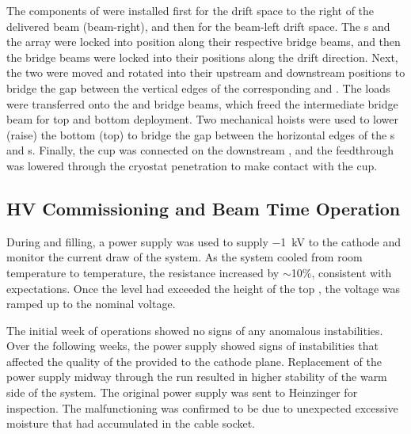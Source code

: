 The  components of  were installed first for the drift space to the right of the delivered beam (beam-right), and then for the beam-left drift space.
The s and the  array were locked into position along their respective bridge beams, and then the bridge beams were locked into their positions along the drift direction.
Next, the two  were moved and rotated into their upstream and downstream positions to bridge the gap between the vertical edges of the corresponding  and .
The  loads were transferred onto the  and   bridge beams, which freed the intermediate bridge beam for top and bottom  deployment.
Two mechanical hoists were used to lower (raise) the bottom (top)  to bridge the gap between the horizontal edges of the s and s.
Finally, the  cup was connected on the downstream , and the  feedthrough was lowered through the cryostat penetration to make contact with the cup.

\subsection{HV Commissioning and Beam Time Operation}
\label{sec:fdsp-hv-commissioning-operation}
During \cooldown and  filling, a power supply was used to supply $-$\SI{1}{kV} to the cathode and monitor the current draw of the system.
As the system cooled from room temperature to  temperature, the resistance increased by $\sim$10\%, consistent with expectations.
Once the  level had exceeded the height of the top , the voltage was ramped up to the nominal voltage.



The initial week of  operations showed no signs of any anomalous instabilities. Over the following weeks, the  power supply showed signs of instabilities that affected the quality of the  provided to the cathode plane. Replacement of the power supply  midway through the run resulted in higher stability of the warm side of the  system. The original power supply was sent to Heinzinger for inspection. The malfunctioning was confirmed to be due to unexpected excessive moisture that had accumulated in the  cable socket.

